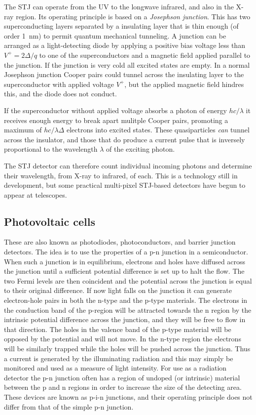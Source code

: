 The STJ can operate 
from the UV to the longwave infrared, and also in the X-ray region.
Its operating principle is based on a {\it Josephson junction}. This has two 
superconducting layers separated by a insulating layer that is thin
enough (of order 1~nm) to permit quantum mechanical tunneling. A
junction can be arranged as a light-detecting diode by applying a
positive bias voltage less than $V^{+}=2\Delta/q$ to one of the
superconductors and a magnetic field applied parallel to the
junction. If the junction is very cold all excited states are
empty. In a normal Josephson junction Cooper pairs could tunnel across
the insulating layer to the superconductor with applied voltage
$V^{+}$, but the applied magnetic field hindres this, and the diode
does not conduct.

If the superconductor without applied voltage absorbs a photon of
energy $hc/\lambda$ it receives enough energy to break apart mulitple
Cooper pairs, promoting a maximum of $hc/\lambda\Delta$ electrons into
excited states. These quasiparticles {\it can} tunnel across the
insulator, and those that do produce a current pulse that is inversely
proportional to the wavelength $\lambda$ of the exciting photon.

The STJ detector can therefore count individual incoming photons and
determine their wavelength, from X-ray to infrared, of each. This is a
technology still in development, but some practical multi-pixel
STJ-based detectors have begun to appear at telescopes.

\subsection{Photovoltaic cells}
These are also known as photodiodes,
photoconductors, and barrier junction detectors. The idea is to use the
properties of a p-n junction in a semiconductor. When such a junction
is in equilibrium, electrons and holes have diffused across the
junction until a sufficient potential difference is set up to halt the
flow. The two Fermi levels are then coincident and the potential
across the junction is equal to their original difference. If now
light falls on the junction it can generate electron-hole pairs in
both the n-type and the p-type materials. The electrons in the
conduction band of the p-region will be attracted towards the n region
by the intrinsic potential difference across the junction, and they
will be free to flow in that direction. The holes in the valence band
of the p-type material will be opposed by the potential and will not
move. In the n-type region the electrons will be similarly trapped
while the holes will be pushed across the junction. Thus a current is
generated by the illuminating radiation and this may simply be
monitored and used as a measure of light intensity. For use as a
radiation detector the p-n junction often has a region of undoped (or
intrinsic) material between the p and n regions in order to increase
the size of the detecting area. These devices are known as p-i-n
junctions, and their operating principle does not differ from that of
the simple p-n junction.

